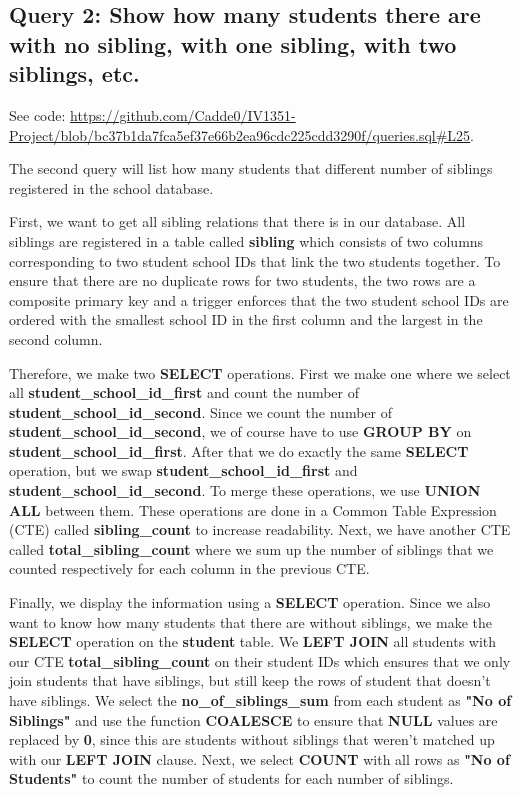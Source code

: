 \documentclass[a4paper]{scrartcl}
\begin{document}
\subsection{Query 2: Show how many students there are with no sibling, with one sibling, with two siblings, etc.}
See code: \url{https://github.com/Cadde0/IV1351-Project/blob/bc37b1da7fca5ef37e66b2ea96cdc225cdd3290f/queries.sql#L25}.

The second query will list how many students that different number of siblings registered in the school database.

First, we want to get all sibling relations that there is in our database. All siblings are registered in a table called \textbf{sibling} which consists of two columns corresponding to two student school IDs that link the two students together. To ensure that there are no duplicate rows for two students, the two rows are a composite primary key and a trigger enforces that the two student school IDs are ordered with the smallest school ID in the first column and the largest in the second column.

Therefore, we make two \textbf{SELECT} operations. First we make one where we select all \textbf{student\_school\_id\_first} and count the number of \textbf{student\_school\_id\_second}. Since we count the number of \textbf{student\_school\_id\_second}, we of course have to use \textbf{GROUP BY} on \textbf{student\_school\_id\_first}. After that we do exactly the same \textbf{SELECT} operation, but we swap \textbf{student\_school\_id\_first} and \textbf{student\_school\_id\_second}. To merge these operations, we use \textbf{UNION ALL} between them. These operations are done in a Common Table Expression (CTE) called \textbf{sibling\_count} to increase readability. Next, we have another CTE called \textbf{total\_sibling\_count} where we sum up the number of siblings that we counted respectively for each column in the previous CTE.

Finally, we display the information using a \textbf{SELECT} operation. Since we also want to know how many students that there are without siblings, we make the \textbf{SELECT} operation on the \textbf{student} table. We \textbf{LEFT JOIN} all students with our CTE \textbf{total\_sibling\_count} on their student IDs which ensures that we only join students that have siblings, but still keep the rows of student that doesn't have siblings. We select the \textbf{no\_of\_siblings\_sum} from each student as \textbf{"No of Siblings"} and use the function \textbf{COALESCE} to ensure that \textbf{NULL} values are replaced by \textbf{0}, since this are students without siblings that weren't matched up with our \textbf{LEFT JOIN} clause. Next, we select \textbf{COUNT} with all rows as \textbf{"No of Students"} to count the number of students for each number of siblings.
\end{document}

